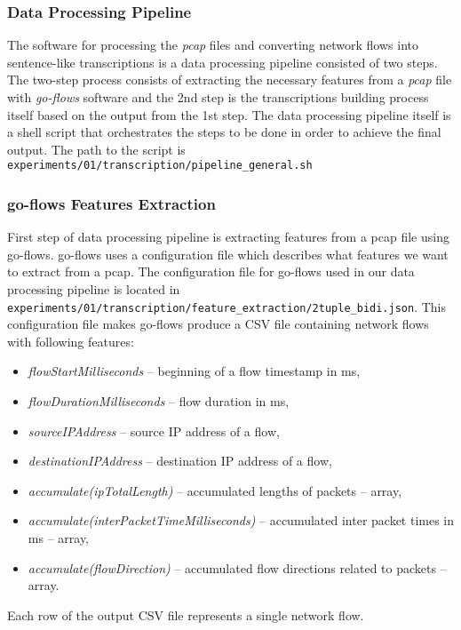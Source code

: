 \documentclass{article}
\begin{document}
\subsubsection{Data Processing Pipeline}
The software for processing the \textit{pcap} files and converting network flows into sentence-like transcriptions is a data processing pipeline consisted of two steps. The two-step process consists of extracting the necessary features from a \textit{pcap} file with \textit{go-flows} software \cite{goflows-reference} and the 2nd step is the transcriptions building process itself based on the output from the 1st step. The data processing pipeline itself is a shell script that orchestrates the steps to be done in order to achieve the final output. The path to the script is \verb|experiments/01/transcription/pipeline_general.sh|


\subsubsection{go-flows Features Extraction}\label{sec:go-flows-feature-extraction}
First step of data processing pipeline is extracting features from a pcap file using go-flows. go-flows uses a configuration file which describes what features we want to extract from a pcap. The configuration file for go-flows used in our data processing pipeline is located in \verb|experiments/01/transcription/feature_extraction/2tuple_bidi.json|. This configuration file makes go-flows produce a CSV file containing network flows with following features:

\begin{itemize}
    \item \textit{flowStartMilliseconds} -- beginning of a flow timestamp in ms,
    \item \textit{flowDurationMilliseconds} -- flow duration in ms,
    \item \textit{sourceIPAddress} -- source IP address of a flow,
    \item \textit{destinationIPAddress} -- destination IP address of a flow,
    \item \textit{accumulate(ipTotalLength)} -- accumulated lengths of packets -- array,
    \item \textit{accumulate(\textunderscore interPacketTimeMilliseconds)} -- accumulated inter packet times in ms -- array,
    \item \textit{accumulate(flowDirection)} -- accumulated flow directions related to packets -- array.
\end{itemize}
Each row of the output CSV file represents a single network flow.
\end{document}

